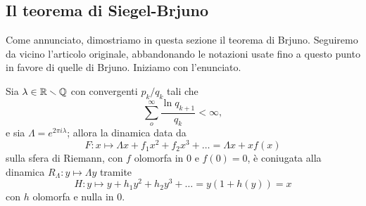 \subsection{Il teorema di Siegel-Brjuno}

Come annunciato, dimostriamo in questa sezione il teorema di Brjuno. Seguiremo da vicino l'articolo originale, abbandonando le notazioni usate fino a questo punto in favore di quelle di Brjuno. Iniziamo con l'enunciato.

\begin{teo} Sia $\lambda\in\mathbb{R}\smallsetminus\mathbb{Q}$ con convergenti $p_k/q_k$ tali che 
   \[\sum_o^\infty \frac{\ln q_{k+1}}{q_k}<\infty,\]
  e sia $\Lambda=e^{2\pi i\lambda}$; allora la dinamica data da
   \[F:x\mapsto \Lambda x + f_1 x^2+f_2 x^3+\dots=\Lambda x+xf(x)\]
  sulla sfera di Riemann, con $f$ olomorfa in $0$ e $f(0)=0$, è coniugata alla dinamica $R_\Lambda:y\mapsto \Lambda y$ tramite
   \[H:y\mapsto y+h_1 y^2+h_2 y^3+\dots =y(1+h(y))=x\]
  con $h$ olomorfa e nulla in $0$.
\end{teo}

